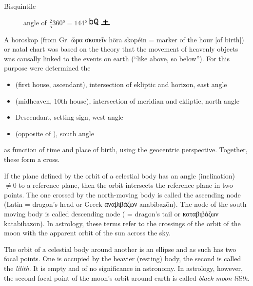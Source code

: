\documentclass[british,final,landscape]{scrartcl}
\begin{document}
\begin{refsection}
\begin{description}
   \item[Bisquintile]{angle of \(\frac{2}{5} \ang{360} = \ang{144}\) \includegraphics[width=5mm]{Astrology/Bisquintile} \includegraphics[width=5mm]{Astrology/Bisquintile2}}
\end{description}


A horoskop (from Gr. \foreignlanguage{greek}{ὥρα σκοπεῖν} hōra skopéin = marker of the hour [of birth]) or natal chart was based on the theory that the movement of heavenly objects was causally linked to the events on earth (``like above, so below''). For this purpose were determined the
\begin{itemize}
  \item{ (first house, ascendant), intersection of ekliptic and horizon, east angle}
  \item{ (midheaven, 10th house), intersection of meridian and ekliptic, north angle}
  \item{Descendant, setting sign, west angle }
  \item{ (opposite of ), south angle}
\end{itemize}
as function of time and place of birth, using the geocentric perspective. Together, these form a cross.

If the plane defined by the orbit of a celestial body has an angle (inclination) \(\neq 0\) to a reference plane, then the orbit intersects the reference plane in two points. The one crossed by the north-moving body is called the ascending node (Latin  = dragon's head or Greek \foreignlanguage{greek}{αναβιβάζων} anabibazōn). The node of the south-moving body is called descending node ( = dragon's tail or \foreignlanguage{greek}{καταβιβάζων} katabibazōn). In astrology, these terms refer to the crossings of the orbit of the moon with the apparent orbit of the sun across the sky.

The orbit of a celestial body around another is an ellipse and as such has two focal points. One is occupied by the heavier (resting) body, the second is called the \emph{lilith}. It is empty and of no significance in astronomy. In astrology, however, the second focal point of the moon's orbit around earth is called \emph{black moon lilith}.


\end{refsection}
\end{document}
